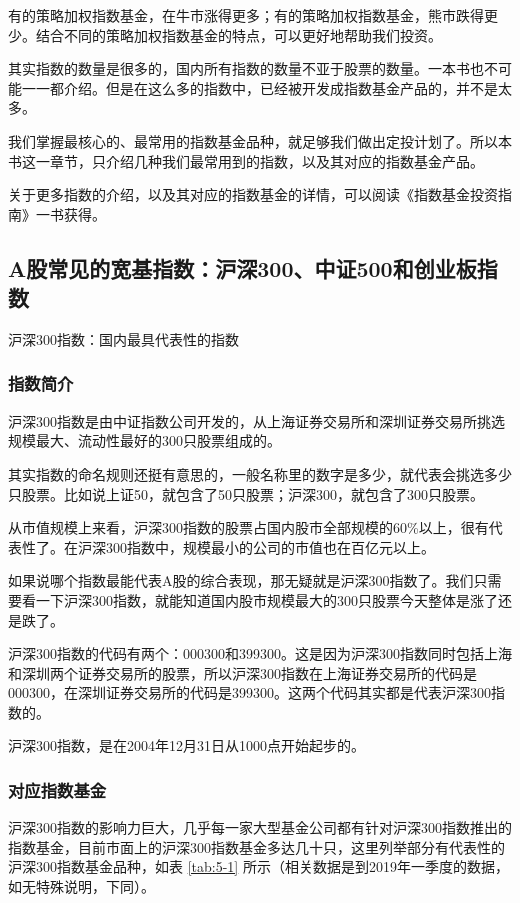 有的策略加权指数基金，在牛市涨得更多；有的策略加权指数基金，熊市跌得更少。结合不同的策略加权指数基金的特点，可以更好地帮助我们投资。

其实指数的数量是很多的，国内所有指数的数量不亚于股票的数量。一本书也不可能一一都介绍。但是在这么多的指数中，已经被开发成指数基金产品的，并不是太多。

我们掌握最核心的、最常用的指数基金品种，就足够我们做出定投计划了。所以本书这一章节，只介绍几种我们最常用到的指数，以及其对应的指数基金产品。

关于更多指数的介绍，以及其对应的指数基金的详情，可以阅读《指数基金投资指南》一书获得。

\subsection{A股常见的宽基指数：沪深300、中证500和创业板指数}
{\fangsong 沪深300指数：国内最具代表性的指数}

\subsubsection{指数简介}

沪深300指数是由中证指数公司开发的，从上海证券交易所和深圳证券交易所挑选规模最大、流动性最好的300只股票组成的。

其实指数的命名规则还挺有意思的，一般名称里的数字是多少，就代表会挑选多少只股票。比如说上证50，就包含了50只股票；沪深300，就包含了300只股票。

从市值规模上来看，沪深300指数的股票占国内股市全部规模的60\%以上，很有代表性了。在沪深300指数中，规模最小的公司的市值也在百亿元以上。

如果说哪个指数最能代表A股的综合表现，那无疑就是沪深300指数了。我们只需要看一下沪深300指数，就能知道国内股市规模最大的300只股票今天整体是涨了还是跌了。

沪深300指数的代码有两个：000300和399300。这是因为沪深300指数同时包括上海和深圳两个证券交易所的股票，所以沪深300指数在上海证券交易所的代码是000300，在深圳证券交易所的代码是399300。这两个代码其实都是代表沪深300指数的。

沪深300指数，是在2004年12月31日从1000点开始起步的。

\subsubsection{对应指数基金}

沪深300指数的影响力巨大，几乎每一家大型基金公司都有针对沪深300指数推出的指数基金，目前市面上的沪深300指数基金多达几十只，这里列举部分有代表性的沪深300指数基金品种，如表 \ref{tab:5-1} 所示（相关数据是到2019年一季度的数据，如无特殊说明，下同）。

